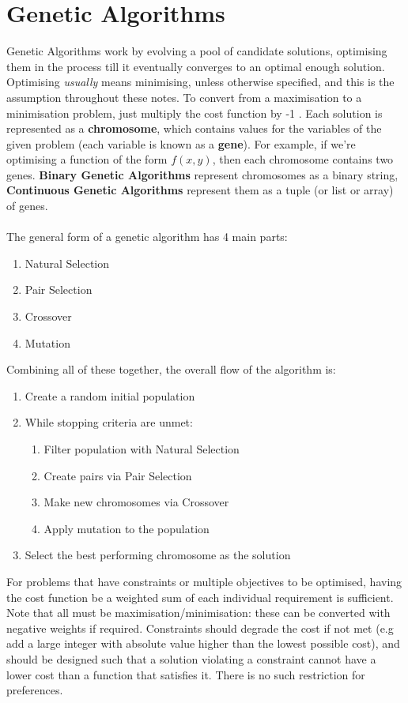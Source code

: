 \section{Genetic Algorithms}

Genetic Algorithms work by evolving a pool of candidate solutions, optimising them in the process till it eventually converges to an optimal enough solution. Optimising \textit{usually} means minimising, unless otherwise specified, and this is the assumption throughout these notes. To convert from a maximisation to a minimisation problem, just multiply the cost function by -1 .
Each solution is represented as a \textbf{chromosome}, which contains values for the variables of the given problem (each variable is known as a \textbf{gene}). For example, if we're optimising a function of the form \( f(x,y) \), then each chromosome contains two genes. \textbf{Binary Genetic Algorithms} represent chromosomes as a binary string, \textbf{Continuous Genetic Algorithms} represent them as a tuple (or list or array) of genes.
\\ \\
The general form of a genetic algorithm has 4 main parts:
\begin{enumerate}
    \item Natural Selection
    \item Pair Selection
    \item Crossover
    \item Mutation\\ 
\end{enumerate}
Combining all of these together, the overall flow of the algorithm is: 
\begin{enumerate}[label=\Alph*]
\item Create a random initial population
\item While stopping criteria are unmet:
\begin{enumerate}[label=\arabic*]
    \item Filter population with Natural Selection
    \item Create pairs via Pair Selection
    \item Make new chromosomes via Crossover
    \item Apply mutation to the population
\end{enumerate}
\item Select the best performing chromosome as the solution\\
\end{enumerate}
For problems that have constraints or multiple objectives to be optimised, having the cost function be a weighted sum of each individual requirement is sufficient. Note that all must be maximisation/minimisation: these can be converted with negative weights if required. Constraints should degrade the cost if not met (e.g add a large integer with absolute value higher than the lowest possible cost), and should be designed such that a solution violating a constraint cannot have a lower cost than a function that satisfies it. There is no such restriction for preferences. 

